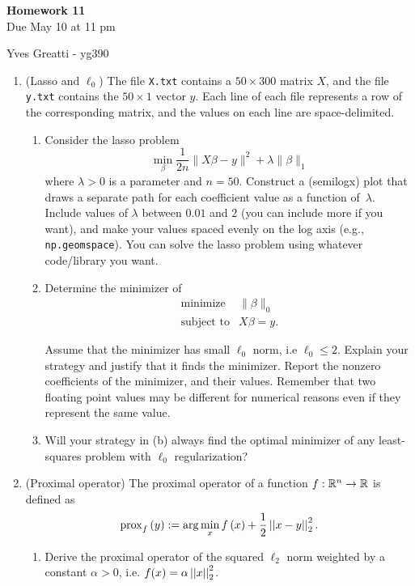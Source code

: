 \documentclass[12pt,twoside]{article}
\begin{document}
\begin{center}
{\large{\textbf{Homework 11}} } \vspace{0.2cm}\\
Due May 10 at 11 pm
\end{center}
Yves Greatti - yg390\\

\begin{enumerate}

\item (Lasso and $\ell_0$)
The file \texttt{X.txt} contains a $50 \times 300$ matrix $X$,
  and the file \texttt{y.txt} contains the $50\times 1$ vector
  $y$.  Each line of each file represents a row of the corresponding
  matrix, and the values on each line are space-delimited.
  \begin{enumerate}
  \item Consider the lasso problem
    $$\min_{\beta} \frac{1}{2n}\|X\beta -y\|^2 + \lambda\|\beta\|_1$$
    where $\lambda>0$ is a parameter and $n=50$.  Construct a (semilogx) plot
    that draws a
    separate path for each coefficient value as a function
    of~$\lambda$.
    Include values of $\lambda$ between $0.01$ and $2$ (you can
    include more if you want),
    and make your values spaced evenly on the log axis (e.g.,
    \texttt{np.geomspace}).  You can solve the lasso problem using
    whatever code/library you want.
  \item Determine the minimizer of
    $$\begin{array}{ll}
    \text{minimize} & \|\beta\|_0\\
    \text{subject to} & X\beta = y.
    \end{array}$$
    
    Assume that the minimizer has small $\ell_0$ norm, i.e $\ell_0 \leq 2$. Explain your strategy and justify that it finds the minimizer.  
    Report the nonzero coefficients of the minimizer, and
    their values.  Remember that two floating point values may be different for numerical reasons even if they represent the same value.
    \item Will your strategy in (b) always find the optimal minimizer of any least-squares problem with $\ell_0$ regularization?
  \end{enumerate}
  
 \newpage
 \item (Proximal operator) The proximal operator of a function $f: \mathbb{R}^n \rightarrow \mathbb{R}$ is defined as
\begin{align}
\operatorname{prox}_{f}\left( y \right) := \arg \min_{x} f\left( x \right)+ \frac{1}{2} \left|\left| x-y \right|\right| _{2}^2.
\end{align}
  \begin{enumerate}
  \item Derive the proximal operator of the squared $\ell_2$ norm weighted by a constant $\alpha > 0$, i.e. $f(x)=\alpha \left|\left| x \right|\right| _{2}^2$.


\end{enumerate}
\end{enumerate}
\end{document}
